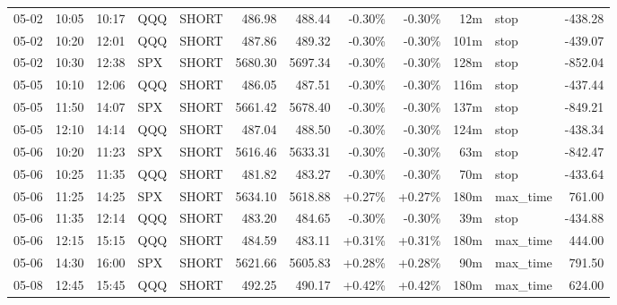 \documentclass[11pt,a4paper,twoside]{article}
\begin{document}
\begin{center}
\begin{longtable}{>{\color{txtmain}}l l l l l r r r r r >{\color{txtmain}}l r}
05-02 & 10:05 & 10:17 & QQQ & SHORT & 486.98 & 488.44 & \textcolor{lossred}{-0.30\%} & \textcolor{lossred}{-0.30\%} & 12m & stop & \textcolor{lossred}{-438.28} \\
05-02 & 10:20 & 12:01 & QQQ & SHORT & 487.86 & 489.32 & \textcolor{lossred}{-0.30\%} & \textcolor{lossred}{-0.30\%} & 101m & stop & \textcolor{lossred}{-439.07} \\
05-02 & 10:30 & 12:38 & SPX & SHORT & 5680.30 & 5697.34 & \textcolor{lossred}{-0.30\%} & \textcolor{lossred}{-0.30\%} & 128m & stop & \textcolor{lossred}{-852.04} \\
05-05 & 10:10 & 12:06 & QQQ & SHORT & 486.05 & 487.51 & \textcolor{lossred}{-0.30\%} & \textcolor{lossred}{-0.30\%} & 116m & stop & \textcolor{lossred}{-437.44} \\
05-05 & 11:50 & 14:07 & SPX & SHORT & 5661.42 & 5678.40 & \textcolor{lossred}{-0.30\%} & \textcolor{lossred}{-0.30\%} & 137m & stop & \textcolor{lossred}{-849.21} \\
05-05 & 12:10 & 14:14 & QQQ & SHORT & 487.04 & 488.50 & \textcolor{lossred}{-0.30\%} & \textcolor{lossred}{-0.30\%} & 124m & stop & \textcolor{lossred}{-438.34} \\
05-06 & 10:20 & 11:23 & SPX & SHORT & 5616.46 & 5633.31 & \textcolor{lossred}{-0.30\%} & \textcolor{lossred}{-0.30\%} & 63m & stop & \textcolor{lossred}{-842.47} \\
05-06 & 10:25 & 11:35 & QQQ & SHORT & 481.82 & 483.27 & \textcolor{lossred}{-0.30\%} & \textcolor{lossred}{-0.30\%} & 70m & stop & \textcolor{lossred}{-433.64} \\
05-06 & 11:25 & 14:25 & SPX & SHORT & 5634.10 & 5618.88 & \textcolor{wingreen}{+0.27\%} & \textcolor{wingreen}{+0.27\%} & 180m & max\_time & \textcolor{wingreen}{761.00} \\
05-06 & 11:35 & 12:14 & QQQ & SHORT & 483.20 & 484.65 & \textcolor{lossred}{-0.30\%} & \textcolor{lossred}{-0.30\%} & 39m & stop & \textcolor{lossred}{-434.88} \\
05-06 & 12:15 & 15:15 & QQQ & SHORT & 484.59 & 483.11 & \textcolor{wingreen}{+0.31\%} & \textcolor{wingreen}{+0.31\%} & 180m & max\_time & \textcolor{wingreen}{444.00} \\
05-06 & 14:30 & 16:00 & SPX & SHORT & 5621.66 & 5605.83 & \textcolor{wingreen}{+0.28\%} & \textcolor{wingreen}{+0.28\%} & 90m & max\_time & \textcolor{wingreen}{791.50} \\
05-08 & 12:45 & 15:45 & QQQ & SHORT & 492.25 & 490.17 & \textcolor{wingreen}{+0.42\%} & \textcolor{wingreen}{+0.42\%} & 180m & max\_time & \textcolor{wingreen}{624.00} \\

\end{longtable}
\end{center}
\end{document}

